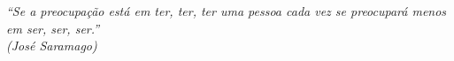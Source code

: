\begin{epigrafe}
    \vspace*{\fill}
	\begin{flushright}
		\textit{%
		``Se a preocupação está em ter, ter, ter uma pessoa cada vez se preocupará
    menos em ser, ser, ser.''\\
		(José Saramago)}
	\end{flushright}
\end{epigrafe}
